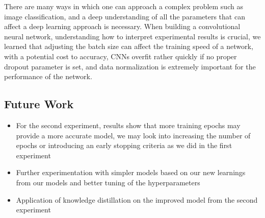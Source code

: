 There are many ways in which one can approach a complex problem such as image classification, and a deep understanding of all the parameters that can affect a deep learning approach is necessary.
When building a convolutional neural network, understanding how to interpret experimental results is crucial, we learned that adjusting the batch size can affect the training speed of a network, with a potential cost to accuracy, CNNs overfit rather quickly if no proper dropout parameter is set, and data normalization is extremely important for the performance of the network.

\subsection*{Future Work}
\begin{itemize}
    \item For the second experiment, results show that more training epochs may provide a more accurate model, we may look into increasing the number of epochs or introducing an early stopping criteria as we did in the first experiment
    \item Further experimentation with simpler models based on our new learnings from our models and better tuning of the hyperparameters
    \item Application of knowledge distillation on the improved model from the second experiment
\end{itemize}
